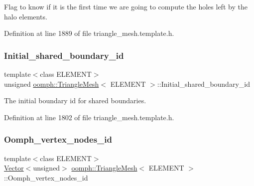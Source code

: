Flag to know if it is the first time we are going to compute the holes left by the halo elements. 



Definition at line 1889 of file triangle\+\_\+mesh.\+template.\+h.

\mbox{\label{classoomph_1_1TriangleMesh_a2a450374603e117c534221c13e2cae86}} 
\subsubsection{\texorpdfstring{Initial\+\_\+shared\+\_\+boundary\+\_\+id}{Initial\_shared\_boundary\_id}}
{\footnotesize\ttfamily template$<$class E\+L\+E\+M\+E\+NT$>$ \\
unsigned \hyperlink{classoomph_1_1TriangleMesh}{oomph\+::\+Triangle\+Mesh}$<$ E\+L\+E\+M\+E\+NT $>$\+::Initial\+\_\+shared\+\_\+boundary\+\_\+id\hspace{0.3cm}{\ttfamily [protected]}}



The initial boundary id for shared boundaries. 



Definition at line 1802 of file triangle\+\_\+mesh.\+template.\+h.

\mbox{\label{classoomph_1_1TriangleMesh_a9fc2a4cae497a1b626293831b9824ca5}} 
\subsubsection{\texorpdfstring{Oomph\+\_\+vertex\+\_\+nodes\+\_\+id}{Oomph\_vertex\_nodes\_id}}
{\footnotesize\ttfamily template$<$class E\+L\+E\+M\+E\+NT$>$ \\
\hyperlink{classoomph_1_1Vector}{Vector}$<$unsigned$>$ \hyperlink{classoomph_1_1TriangleMesh}{oomph\+::\+Triangle\+Mesh}$<$ E\+L\+E\+M\+E\+NT $>$\+::Oomph\+\_\+vertex\+\_\+nodes\+\_\+id\hspace{0.3cm}{\ttfamily [protected]}}



